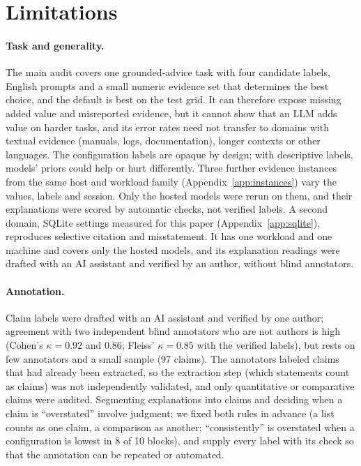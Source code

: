 \section*{Limitations}
\label{sec:limitations}
\paragraph{Task and generality.}
The main audit covers one grounded-advice task with four candidate labels, English prompts and a small numeric evidence set that determines the best choice, and the default is best on the test grid. It can therefore expose missing added value and misreported evidence, but it cannot show that an LLM adds value on harder tasks, and its error rates need not transfer to domains with textual evidence (manuals, logs, documentation), longer contexts or other languages. The configuration labels are opaque by design; with descriptive labels, models' priors could help or hurt differently. Three further evidence instances from the same host and workload family (Appendix~\ref{app:instances}) vary the values, labels and session. Only the hosted models were rerun on them, and their explanations were scored by automatic checks, not verified labels. A second domain, SQLite settings measured for this paper (Appendix~\ref{app:sqlite}), reproduces selective citation and misstatement. It has one workload and one machine and covers only the hosted models, and its explanation readings were drafted with an AI assistant and verified by an author, without blind annotators.

\paragraph{Annotation.}
Claim labels were drafted with an AI assistant and verified by one author; agreement with two independent blind annotators who are not authors is high (Cohen's $\kappa=0.92$ and $0.86$; Fleiss' $\kappa=0.85$ with the verified labels), but rests on few annotators and a small sample (97 claims). The annotators labeled claims that had already been extracted, so the extraction step (which statements count as claims) was not independently validated, and only quantitative or comparative claims were audited. Segmenting explanations into claims and deciding when a claim is ``overstated'' involve judgment; we fixed both rules in advance (a list counts as one claim, a comparison as another; ``consistently'' is overstated when a configuration is lowest in 8 of 10 blocks), and supply every label with its check so that the annotation can be repeated or automated.

